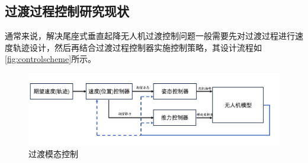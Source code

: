 \subsection{过渡过程控制研究现状}
通常来说，解决尾座式垂直起降无人机过渡控制问题一般需要先对过渡过程进行速度轨迹设计，然后再结合过渡过程控制器实施控制策略，其设计流程如\autoref{fig:controlscheme}所示。
\begin{figure}
    \centering
    \includegraphics[width=1.0\textwidth]{figure/chapter1/控制流程.png}
    \caption{\label{fig:controlscheme}过渡模态控制}
\end{figure}

